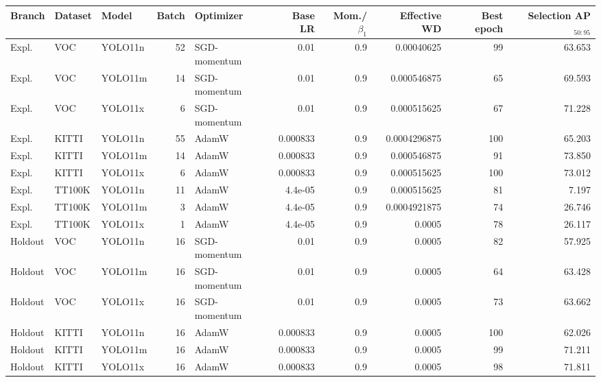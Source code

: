 \begin{tabular}{lllrlrrrrr}
\toprule
Branch & Dataset & Model & Batch & Optimizer & Base LR & Mom./$\beta_1$ & Effective WD & Best epoch & Selection AP$_{50:95}$ \\
\midrule
Expl. & VOC & YOLO11n & 52 & SGD-momentum & 0.01 & 0.9 & 0.00040625 & 99 & 63.653 \\
Expl. & VOC & YOLO11m & 14 & SGD-momentum & 0.01 & 0.9 & 0.000546875 & 65 & 69.593 \\
Expl. & VOC & YOLO11x & 6 & SGD-momentum & 0.01 & 0.9 & 0.000515625 & 67 & 71.228 \\
Expl. & KITTI & YOLO11n & 55 & AdamW & 0.000833 & 0.9 & 0.0004296875 & 100 & 65.203 \\
Expl. & KITTI & YOLO11m & 14 & AdamW & 0.000833 & 0.9 & 0.000546875 & 91 & 73.850 \\
Expl. & KITTI & YOLO11x & 6 & AdamW & 0.000833 & 0.9 & 0.000515625 & 100 & 73.012 \\
Expl. & TT100K & YOLO11n & 11 & AdamW & 4.4e-05 & 0.9 & 0.000515625 & 81 & 7.197 \\
Expl. & TT100K & YOLO11m & 3 & AdamW & 4.4e-05 & 0.9 & 0.0004921875 & 74 & 26.746 \\
Expl. & TT100K & YOLO11x & 1 & AdamW & 4.4e-05 & 0.9 & 0.0005 & 78 & 26.117 \\
Holdout & VOC & YOLO11n & 16 & SGD-momentum & 0.01 & 0.9 & 0.0005 & 82 & 57.925 \\
Holdout & VOC & YOLO11m & 16 & SGD-momentum & 0.01 & 0.9 & 0.0005 & 64 & 63.428 \\
Holdout & VOC & YOLO11x & 16 & SGD-momentum & 0.01 & 0.9 & 0.0005 & 73 & 63.662 \\
Holdout & KITTI & YOLO11n & 16 & AdamW & 0.000833 & 0.9 & 0.0005 & 100 & 62.026 \\
Holdout & KITTI & YOLO11m & 16 & AdamW & 0.000833 & 0.9 & 0.0005 & 99 & 71.211 \\
Holdout & KITTI & YOLO11x & 16 & AdamW & 0.000833 & 0.9 & 0.0005 & 98 & 71.811 \\
\bottomrule
\end{tabular}
